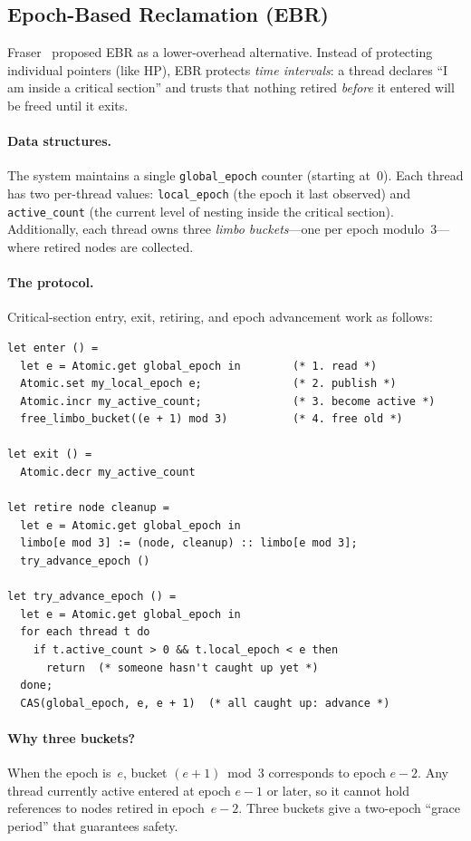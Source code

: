\documentclass[11pt,a4paper]{article}
\begin{document}
\subsection{Epoch-Based Reclamation (EBR)}

Fraser~\cite{fraser2004practical} proposed EBR as a lower-overhead
alternative.  Instead of protecting individual pointers (like HP), EBR
protects \emph{time intervals}: a thread declares ``I am inside a critical
section'' and trusts that nothing retired \emph{before} it entered will be freed
until it exits.

\paragraph{Data structures.}
The system maintains a single \texttt{global\_epoch} counter (starting at~0).
Each thread has two per-thread values: \texttt{local\_epoch} (the epoch it last
observed) and \texttt{active\_count} (the current level of nesting inside the critical section).
Additionally, each thread owns three \emph{limbo buckets}---one per epoch
modulo~3---where retired nodes are collected.

\paragraph{The protocol.}
Critical-section entry, exit, retiring, and epoch advancement work as follows:

\begin{lstlisting}[caption={EBR protocol (pseudocode).},label={lst:ebr}]
let enter () =
  let e = Atomic.get global_epoch in        (* 1. read *)
  Atomic.set my_local_epoch e;              (* 2. publish *)
  Atomic.incr my_active_count;              (* 3. become active *)
  free_limbo_bucket((e + 1) mod 3)          (* 4. free old *)

let exit () =
  Atomic.decr my_active_count

let retire node cleanup =
  let e = Atomic.get global_epoch in
  limbo[e mod 3] := (node, cleanup) :: limbo[e mod 3];
  try_advance_epoch ()

let try_advance_epoch () =
  let e = Atomic.get global_epoch in
  for each thread t do
    if t.active_count > 0 && t.local_epoch < e then
      return  (* someone hasn't caught up yet *)
  done;
  CAS(global_epoch, e, e + 1)  (* all caught up: advance *)
\end{lstlisting}

\paragraph{Why three buckets?}
When the epoch is~$e$, bucket $(e+1) \bmod 3$ corresponds to epoch $e-2$.
Any thread currently active entered at epoch $e-1$ or later, so it cannot hold
references to nodes retired in epoch~$e-2$.  Three buckets give a two-epoch
``grace period'' that guarantees safety.
\end{document}
